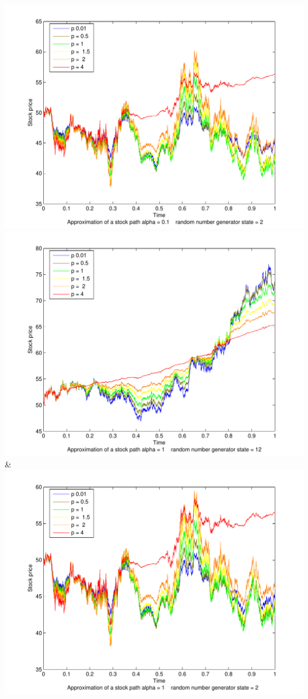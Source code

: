 \documentclass[a4paper,onecolumn,draft]{IEEEtran}
\begin{document}
{			\includegraphics[width=\stockplotsize]{stock_s2_alpha0-1}\NN\cmidrule(lr){1-2}
		 \includegraphics[width=\stockplotsize]{stock_alpha1}&
			\includegraphics[width=\stockplotsize]{stock_s2_alpha1}\NN\cmidrule(lr){1-2}
}
\end{document}
